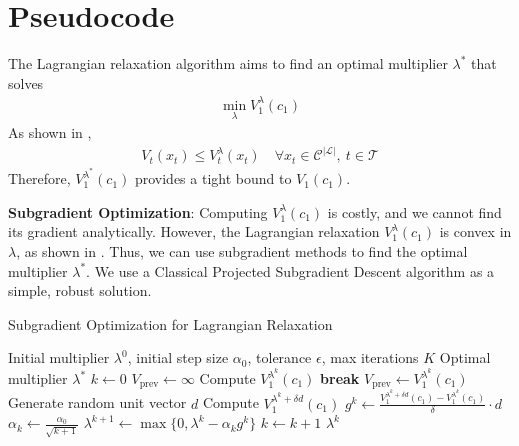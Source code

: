 \documentclass[11pt]{article}
\begin{document}
\vspace{0.5cm}



\newpage

\section{Pseudocode}

The Lagrangian relaxation algorithm aims to find an optimal multiplier $\lambda^{*}$ that solves
\begin{align*}
    \min_{\lambda} V^{\lambda}_{1}(c_{1}) 
\end{align*}
As shown in \cite{topaloglu2009using},
\begin{align*}
    V_t(x_t) \leq V^{\lambda}_t(x_t) \quad \forall x_t \in \mathcal{C}^{|\mathcal{L}|}, \ t \in \mathcal{T}
\end{align*}
Therefore, $V^{\lambda^{*}}_{1}(c_{1})$ provides a tight bound to $V_{1}(c_{1})$.

\vspace{0.5cm}

\noindent
\textbf{Subgradient Optimization}: 
Computing $V^{\lambda}_{1}(c_{1})$ is costly, and we cannot find its gradient analytically.
However, the Lagrangian relaxation $V^{\lambda}_{1}(c_{1})$ is convex in $\lambda$, as shown in \cite{topaloglu2009using}. 
Thus, we can use subgradient methods to find the optimal multiplier $\lambda^*$.
We use a Classical Projected Subgradient Descent algorithm as a simple, robust solution.

\begin{algorithm}
\caption{Subgradient Optimization for Lagrangian Relaxation}
\begin{algorithmic}[1]
\Require Initial multiplier $\lambda^0$, initial step size $\alpha_0$, tolerance $\epsilon$, max iterations $K$
\Ensure Optimal multiplier $\lambda^*$
\State $k \gets 0$
\State $V_{\text{prev}} \gets \infty$
    \State Compute $V^{\lambda^k}_{1}(c_{1})$ 
        \State \textbf{break} 
    \EndIf
    \State $V_{\text{prev}} \gets V^{\lambda^k}_{1}(c_{1})$
    \State Generate random unit vector $d$
    \State Compute $V^{\lambda^k + \delta d}_{1}(c_{1})$ 
    \State $g^k \gets \frac{V^{\lambda^k + \delta d}_{1}(c_{1}) - V^{\lambda^k}_{1}(c_{1})}{\delta} \cdot d$ 
    \State $\alpha_k \gets \frac{\alpha_0}{\sqrt{k+1}}$ 
    \State $\lambda^{k+1} \gets \max\{0, \lambda^k - \alpha_k g^k\}$ 
    \State $k \gets k + 1$
\EndWhile
\State \Return $\lambda^k$
\end{algorithmic}
\end{algorithm}
\end{document}

